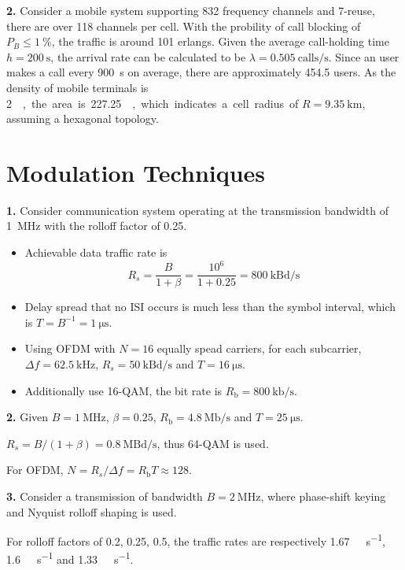 \documentclass[a4paper,12pt]{article}
\newcommand{\baud}{\mathrm{Bd}}
\newcommand{\bit}{\mathrm{b}}
\newcommand{\problem}[1]{\noindent\textbf{#1.}}
\begin{document}
\problem 2  Consider a mobile system supporting 832 frequency channels
and 7-reuse, there are over 118 channels per cell.  With the probility of
call blocking of $P_B \le \SI{1}{\percent}$, the traffic is around 101 erlangs.
Given the average call-holding time $h = \SI{200}{\second}$, the arrival rate
can be calculated to be $\lambda = \SI{0.505}{\mathrm{calls}\per\second}$.
Since an user makes a call every \SI{900}{\second} on average, there are
approximately 454.5 users.  As the density of mobile terminals is
\SI{2}{\per\square{\kilo\metre}}, the area is
\SI{227.25}{\square{\kilo\metre}}, which indicates a cell radius
of $R = \SI{9.35}{\kilo\metre}$, assuming a hexagonal topology.

\section{Modulation Techniques}
\problem 1  Consider communication system operating at the transmission
bandwidth of \SI{1}{\mega\hertz} with the rolloff factor of 0.25.
\begin{itemize}
  \item  Achievable data traffic rate is
    \[R_s = \frac{B}{1 + \beta} = \frac{10^6}{1 + 0.25}
    = \SI{800}{\kilo\baud\per\second}\]
  \item  Delay spread that no ISI occurs is much less than the symbol interval,
    which is $T = B^{-1} = \SI{1}{\micro\second}$.
  \item  Using OFDM with $N = 16$ equally spead carriers, for each subcarrier,
    $\Delta f = \SI{62.5}{\kilo\hertz}$, $R_s = \SI{50}{\kilo\baud\per\second}$
    and $T = \SI{16}{\micro\second}$.
  \item  Additionally use 16-QAM, the bit rate is
    $R_\bit = \SI{800}{\kilo\bit\per\second}$.
\end{itemize}

\problem 2  Given $B = \SI{1}{\mega\hertz}$, $\beta = 0.25$,
$R_\bit = \SI{4.8}{\mega\bit\per\second}$ and $T = \SI{25}{\micro\second}$.

$R_s = B/(1+\beta) = \SI{0.8}{\mega\baud\per\second}$, thus 64-QAM is used.

For OFDM, $N = R_s/\Delta f = R_\bit T \approx 128$.

\problem 3  Consider a transmission of bandwidth $B = \SI{2}{\mega\hertz}$,
where phase-shift keying and Nyquist rolloff shaping is used.

For rolloff factors of 0.2, 0.25, 0.5, the traffic rates are respectively
\SI{1.67}{\mega\baud\per\second}, \SI{1.6}{\mega\baud\per\second} and
\SI{1.33}{\mega\baud\per\second}.
\end{document}
